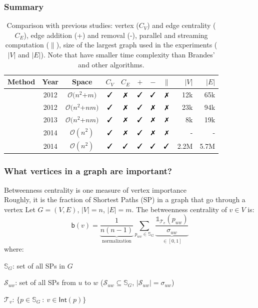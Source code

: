 \documentclass[aspectratio=169]{beamer}
\newcommand{\cmark}{\text{\ding{51}}}%
\newcommand{\xmark}{\text{\ding{55}}}%
\newcommand*{\betw}{\ensuremath{\mathsf{b}}\xspace}
\begin{document}
\begin{frame}
  \frametitle{Summary}
  
  \begin{table}[t!]
    \vspace{-3mm}
    \caption{Comparison with previous studies:  vertex ($C_V$) and edge centrality  ($C_E$), edge addition (+) and removal (-), parallel and streaming computation ($\|$), size of the largest graph used in the experiments ($|V|$ and $|E|$).
    Note that \citet{NasrePR14} have smaller time complexity than Brandes' and other algorithms.}
    \centering
    \small
    \tabcolsep=0.06cm
    \begin{tabular}{ccccccccrr}
    \toprule
    Method							& Year 	&	Space				&	$C_V$	&	$C_E$	&	$+$	&	$-$	&	$\|$	&	$|V|$ & $|E|$	\\
    \midrule
    \citet{LeeLPCC12} 					& 2012	&	$\mathcal{O}(n^2$+$m)$	&	$\cmark$	&	$\xmark$	&	$\cmark$	&	$\cmark$	&	$\xmark$		&	12k	&	65k 		\\
    \citet{GreenMB12}		& 2012 	&	$\mathcal{O}(n^2$+$nm)$	&	$\cmark$	&	$\xmark$	&	$\cmark$	&	$\xmark$	&	$\xmark$		&	23k	&	94k		\\
    \citet{KasWCC13}				& 2013	&	$\mathcal{O}(n^2$+$nm)$	&	$\cmark$	&	$\xmark$	&	$\cmark$	&	$\xmark$	&	$\xmark$		&	8k	&	19k		\\
    \citet{NasrePR14}				& 2014	&	$\mathcal{O}(n^2)$	&	$\cmark$	&	$\xmark$	&	$\cmark$	&	$\xmark$	&	$\xmark$		&	-	&	-		\\
    \citet{KourtellisMB15}							& 2014	&	$\mathcal{O}(n^2)$		&	$\cmark$	&	$\cmark$	&	$\cmark$	&	$\cmark$	&	$\cmark$		&	2.2M	&	5.7M		\\
    \bottomrule
    \end{tabular}
    \label{tab:rel-work}
  \end{table}
\end{frame}

\begin{frame}
  \frametitle{What vertices in a graph are important?}
  Betweenness centrality is one measure of vertex importance\\
  \quad Roughly, it is the fraction of Shortest Paths (SP) in a graph that go through a vertex
  \vfill
  Let $G=(V,E)$, $|V|=n$, $|E|=m$. The betweenness centrality of $v\in V$ is:
  \[
    \betw(v)=\underbrace{\frac{1}{n(n-1)}}_{\mbox{normalization}}\sum_{p_{uw}\in\mathbb{S}_G}
    \underbrace{\frac{\mathds{1}_{\mathcal{T}_v}(p_{uw})}{\sigma_{uw}}}_{\in [0,1]}
  \]
  where:
  \begin{itemize*}
    \item $\mathbb{S}_G$: set of all SPs in $G$
    \item $\mathcal{S}_{uw}$: set of all SPs from $u$ to $w$
      ($\mathcal{S}_{uw}\subseteq\mathbb{S}_G$,
      $|\mathcal{S}_{uw}|=\sigma_{uw}$)
    \item $\mathcal{T}_v$: $\{p\in\mathbb{S}_G ~:~ v\in\mathsf{Int}(p)\}$
  \end{itemize*}
\end{frame}
\end{document}

